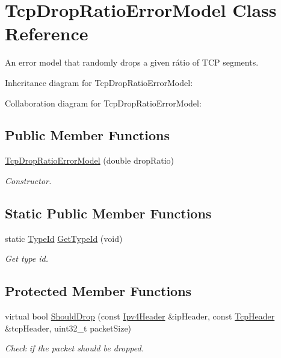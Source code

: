 \hypertarget{classTcpDropRatioErrorModel}{}\section{Tcp\+Drop\+Ratio\+Error\+Model Class Reference}
\label{classTcpDropRatioErrorModel}


An error model that randomly drops a given rátio of T\+CP segments.  




Inheritance diagram for Tcp\+Drop\+Ratio\+Error\+Model\+:


Collaboration diagram for Tcp\+Drop\+Ratio\+Error\+Model\+:
\subsection*{Public Member Functions}
\begin{DoxyCompactItemize}
\item 
\hyperlink{classTcpDropRatioErrorModel_abad6a5fe807c25c5b599522baca0ebd6}{Tcp\+Drop\+Ratio\+Error\+Model} (double drop\+Ratio)
\begin{DoxyCompactList}\small\item\em Constructor. \end{DoxyCompactList}\end{DoxyCompactItemize}
\subsection*{Static Public Member Functions}
\begin{DoxyCompactItemize}
\item 
static \hyperlink{classns3_1_1TypeId}{Type\+Id} \hyperlink{classTcpDropRatioErrorModel_a47092a458e5d9d8618158f89d8756a41}{Get\+Type\+Id} (void)
\begin{DoxyCompactList}\small\item\em Get type id. \end{DoxyCompactList}\end{DoxyCompactItemize}
\subsection*{Protected Member Functions}
\begin{DoxyCompactItemize}
\item 
virtual bool \hyperlink{classTcpDropRatioErrorModel_a7e543a7b2bb5a40320dac331e80976f7}{Should\+Drop} (const \hyperlink{classns3_1_1Ipv4Header}{Ipv4\+Header} \&ip\+Header, const \hyperlink{classns3_1_1TcpHeader}{Tcp\+Header} \&tcp\+Header, uint32\+\_\+t packet\+Size)
\begin{DoxyCompactList}\small\item\em Check if the packet should be dropped. \end{DoxyCompactList}\end{DoxyCompactItemize}

